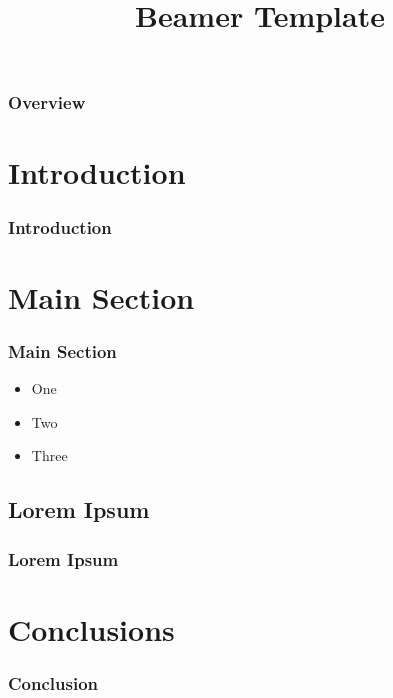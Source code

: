\documentclass{beamer}
\title{Beamer Template}
\author{}
\begin{document}

\begin{frame}
	\titlepage
\end{frame}

\begin{frame}
	\frametitle{Overview}
	\tableofcontents
\end{frame}

\section{Introduction}%
\label{sec:Introduction}

\begin{frame}
	\frametitle{Introduction}
\end{frame}

\section{Main Section}%
\label{sec:Main Section}

\begin{frame}
	\frametitle{Main Section}
	\begin{itemize}
		\item One
		\item Two
		\item Three
	\end{itemize}
\end{frame}

\begin{frame}
	\subsection{Lorem Ipsum}
	\frametitle{Lorem Ipsum}
	\lipsum[1]
\end{frame}

\section{Conclusions}%
\label{sec:Conclusions}

\begin{frame}
	\frametitle{Conclusion}
\end{frame}

\end{document}
